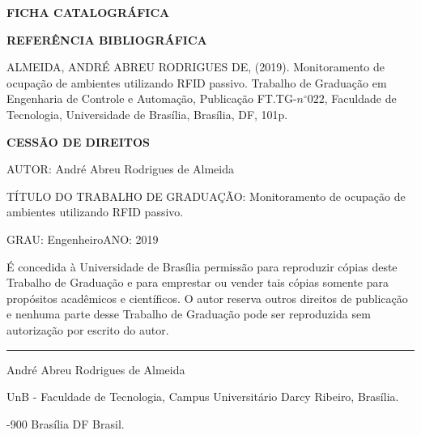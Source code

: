 \noindent \textbf{FICHA CATALOGRÁFICA}

\noindent %

\noindent \medskip{}


\noindent \textbf{REFERÊNCIA BIBLIOGRÁFICA}

ALMEIDA, ANDRÉ ABREU RODRIGUES DE, (2019). Monitoramento de ocupação de ambientes utilizando RFID passivo. Trabalho de Graduação em Engenharia de Controle e Automação, Publicação FT.TG-$n^{\circ}022$,
Faculdade de Tecnologia, Universidade de Brasília, Brasília, DF, 101p.

\noindent \bigskip{}


\noindent \textbf{CESSÃO DE DIREITOS}

\noindent AUTOR: André Abreu Rodrigues de Almeida

TÍTULO DO TRABALHO DE GRADUAÇÃO: Monitoramento de ocupação de ambientes utilizando RFID passivo.

\noindent \medskip{}


\noindent GRAU: Engenheiro\hfill{}ANO: 2019\hfill{}

\noindent \medskip{}


É concedida à Universidade de Brasília permissão para reproduzir cópias
deste Trabalho de Graduação e para emprestar ou vender tais cópias
somente para propósitos acadêmicos e científicos. O autor reserva
outros direitos de publicação e nenhuma parte desse Trabalho de Graduação
pode ser reproduzida sem autorização por escrito do autor.

\noindent \bigskip{}


\noindent \rule[0.5ex]{1\columnwidth}{1pt}

\noindent André Abreu Rodrigues de Almeida

\noindent UnB - Faculdade de Tecnologia, Campus Universitário Darcy Ribeiro, Brasília.

-900 Brasília \textendash{} DF \textendash{} Brasil.
